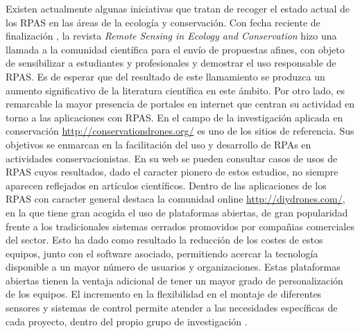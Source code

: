 \documentclass[11pt,]{article}
\begin{document}
Existen actualmente algunas iniciativas que tratan de recoger el estado
actual de los RPAS en las áreas de la ecología y conservación. Con fecha
reciente de finalización , la revista \emph{Remote Sensing in Ecology
and Conservation} hizo una llamada a la comunidad científica para el
envío de propuestas afines, con objeto de sensibilizar a estudiantes y
profesionales y demostrar el uso responsable de RPAS. Es de esperar que
del resultado de este llamamiento se produzca un aumento significativo
de la literatura científica en este ámbito. Por otro lado, es remarcable
la mayor presencia de portales en internet que centran su actividad en
torno a las aplicaciones con RPAS. En el campo de la investigación
aplicada en conservación \url{http://conservationdrones.org/} es uno de
los sitios de referencia. Sus objetivos se enmarcan en la facilitación
del uso y desarrollo de RPAs en actividades conservacionistas. En su web
se pueden consultar casos de usos de RPAS cuyos resultados, dado el
caracter pionero de estos estudios, no siempre aparecen reflejados en
artículos científicos. Dentro de las aplicaciones de los RPAS con
caracter general destaca la comunidad online
\url{http://diydrones.com/}, en la que tiene gran acogida el uso de
plataformas abiertas, de gran popularidad frente a los tradicionales
sistemas cerrados promovidos por compañias comerciales del sector. Esto
ha dado como resultado la reducción de los costes de estos equipos,
junto con el software asociado, permitiendo acercar la tecnología
disponible a un mayor número de usuarios y organizaciones. Estas
plataformas abiertas tienen la ventaja adicional de tener un mayor grado
de personalización de los equipos. El incremento en la flexibilidad en
el montaje de diferentes sensores y sistemas de control permite atender
a las necesidades específicas de cada proyecto, dentro del propio grupo
de investigación \citep{Koh2012}.
\end{document}
